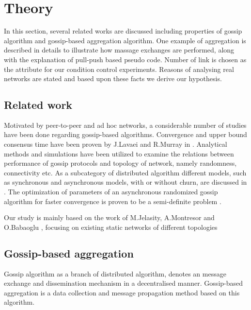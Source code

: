 \section{Theory}
\label{sec:theory}
In this section, several related works are discussed including properties of
gossip algorithm and gossip-based aggregation algorithm. One example of
aggregation is described in details to illustrate how massage exchanges are
performed, along with the explanation of pull-push based pseudo code. Number of
link is chosen as the attribute for our condition control experiments. Reasons
of analysing real networks are stated and based upon these facts we derive our
hypothesis.

\subsection{Related work}
Motivated by peer-to-peer and ad hoc networks, a considerable number of studies have been done regarding gossip-based algorithms. Convergence and upper bound consensus time have been proven by J.Lavaei and R.Murray in \cite{5929538}. Analytical methods and simulations have been utilized to examine the relations between performance of gossip protocols and topology of network, namely randomness, connectivity etc. As a subcategory of distributed algorithm different models, such as synchronous and asynchronous models, with or without churn, are discussed in \cite{Lynch:1996:DA:525656}. The optimization of parameters of an asynchronous randomized gossip algorithm for faster convergence is proven to be a semi-definite problem \cite{Boyd2004}.

Our study is mainly based on the work of M.Jelasity, A.Montresor and O.Babaoglu \cite{jelasity_gossip-based_2005}, focusing on existing static networks of different topologies \cite{knight_internet_2011}

\subsection{Gossip-based aggregation}
Gossip algorithm as a branch of distributed algorithm, denotes an message exchange and dissemination mechanism in a decentralised manner. Gossip-based aggregation is a data collection and message propagation method based on this algorithm.

